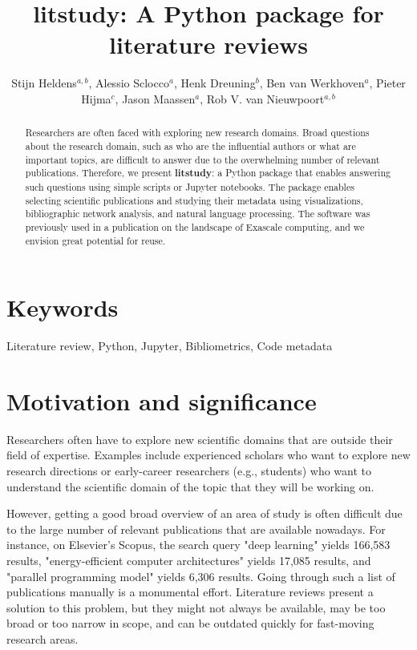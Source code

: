 \documentclass{article}
\title{litstudy: A Python package for literature reviews}
\author{Stijn Heldens$^{a,b}$, Alessio Sclocco$^{a}$, Henk Dreuning$^{b}$, Ben van Werkhoven$^{a}$, Pieter Hijma$^{c}$, Jason Maassen$^{a}$, Rob V. van Nieuwpoort$^{a,b}$}
\date{}
\begin{document}
\maketitle

\begin{abstract}
Researchers are often faced with exploring new research domains. Broad questions about the research domain, such as who are the influential authors or what are important topics, are difficult to answer due to the overwhelming number of relevant publications. Therefore, we present \textbf{litstudy}: a Python package that enables answering such questions using simple scripts or Jupyter notebooks. The package enables selecting scientific publications and studying their metadata using visualizations, bibliographic network analysis, and natural language processing. The software was previously used in a publication on the landscape of Exascale computing, and we envision great potential for reuse.
\end{abstract}

\section{Keywords}
Literature review, Python, Jupyter, Bibliometrics, Code metadata

\section{Motivation and significance}

Researchers often have to explore new scientific domains that are outside their field of expertise. Examples include experienced scholars who want to explore new research directions or early-career researchers (e.g., students) who want to understand the scientific domain of the topic that they will be working on.

However, getting a good broad overview of an area of study is often difficult due to the large number of relevant publications that are available nowadays. For instance, on Elsevier's Scopus, the search query "deep learning" yields 166,583 results, "energy-efficient computer architectures" yields 17,085 results, and "parallel programming model" yields 6,306 results. Going through such a list of publications manually is a monumental effort. Literature reviews present a solution to this problem, but they might not always be available, may be too broad or too narrow in scope, and can be outdated quickly for fast-moving research areas.
\end{document}
